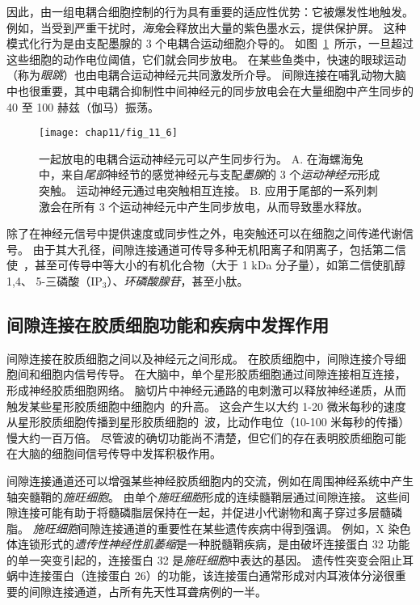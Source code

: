 因此，由一组电耦合细胞控制的行为具有重要的适应性优势：它被爆发性地触发。
例如，当受到严重干扰时，\textit{海兔}会释放出大量的紫色墨水云，提供保护屏。
这种模式化行为是由支配墨腺的 3 个电耦合运动细胞介导的。
如图~\ref{fig:11_6}~所示，一旦超过这些细胞的动作电位阈值，它们就会同步放电。
在某些鱼类中，快速的眼球运动（称为\textit{眼跳}）也由电耦合运动神经元共同激发所介导。
间隙连接在哺乳动物大脑中也很重要，其中电耦合抑制性中间神经元的同步放电会在大量细胞中产生同步的 40 至 100 赫兹（伽马）振荡。


\begin{figure}[htbp]
	\centering
	\texttt{[image: chap11/fig\_11\_6]}
	\caption{一起放电的电耦合运动神经元可以产生同步行为\cite{carew1976two}。 
		A. 在海螺海兔中，来自\textit{尾部}神经节的感觉神经元与支配\textit{墨腺}的 3 个\textit{运动神经元}形成突触。
		运动神经元通过电突触相互连接。
		B. 应用于尾部的一系列刺激会在所有 3 个运动神经元中产生同步放电，从而导致墨水释放。}
	\label{fig:11_6}
\end{figure}


除了在神经元信号中提供速度或同步性之外，电突触还可以在细胞之间传递代谢信号。
由于其大孔径，间隙连接通道可传导多种无机阳离子和阴离子，包括第二信使~，甚至可传导中等大小的有机化合物（大于 1 kDa 分子量），如第二信使肌醇 1,4、 5-三磷酸（IP$_3$）、\textit{环磷酸腺苷}，甚至小肽。



\subsection{间隙连接在胶质细胞功能和疾病中发挥作用}

间隙连接在胶质细胞之间以及神经元之间形成。
在胶质细胞中，间隙连接介导细胞间和细胞内信号传导。 
在大脑中，单个星形胶质细胞通过间隙连接相互连接，形成神经胶质细胞网络。
脑切片中神经元通路的电刺激可以释放神经递质，从而触发某些星形胶质细胞中细胞内~的升高。
这会产生以大约 1-20 微米每秒的速度从星形胶质细胞传播到星形胶质细胞的~波，比动作电位（10-100 米每秒的传播）慢大约一百万倍。
尽管波的确切功能尚不清楚，但它们的存在表明胶质细胞可能在大脑的细胞间信号传导中发挥积极作用。


间隙连接通道还可以增强某些神经胶质细胞内的交流，例如在周围神经系统中产生轴突髓鞘的\textit{施旺细胞}。
由单个\textit{施旺细胞}形成的连续髓鞘层通过间隙连接。
这些间隙连接可能有助于将髓磷脂层保持在一起，并促进小代谢物和离子穿过多层髓磷脂。
\textit{施旺细胞}间隙连接通道的重要性在某些遗传疾病中得到强调。
例如，X 染色体连锁形式的\textit{遗传性神经性肌萎缩}是一种脱髓鞘疾病，是由破坏连接蛋白 32 功能的单一突变引起的，连接蛋白 32 是\textit{施旺细胞}中表达的基因。
遗传性突变会阻止耳蜗中连接蛋白（连接蛋白 26）的功能，该连接蛋白通常形成对内耳液体分泌很重要的间隙连接通道，占所有先天性耳聋病例的一半。



